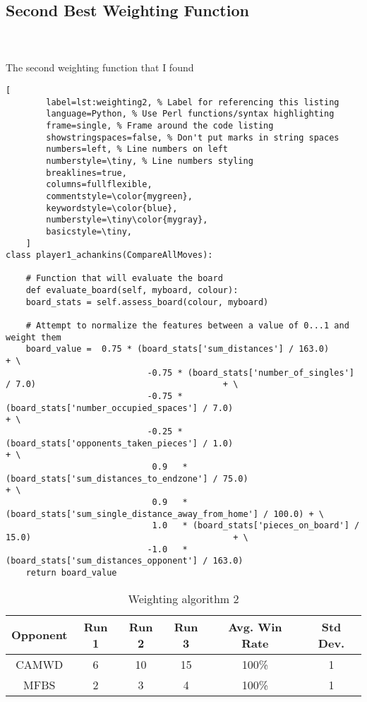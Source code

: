 \documentclass[
	12pt, %
]{fphw}
\begin{document}
\subsection{Second Best Weighting Function}

\hfill\\ \\  The second weighting function that I found

\begin{lstlisting}[
		label=lst:weighting2, % Label for referencing this listing
		language=Python, % Use Perl functions/syntax highlighting
		frame=single, % Frame around the code listing
		showstringspaces=false, % Don't put marks in string spaces
		numbers=left, % Line numbers on left
		numberstyle=\tiny, % Line numbers styling
		breaklines=true,
		columns=fullflexible,
		commentstyle=\color{mygreen},
		keywordstyle=\color{blue},
		numberstyle=\tiny\color{mygray},
		basicstyle=\tiny,
	]
class player1_achankins(CompareAllMoves):

    # Function that will evaluate the board
    def evaluate_board(self, myboard, colour):
    board_stats = self.assess_board(colour, myboard)

    # Attempt to normalize the features between a value of 0...1 and weight them
    board_value =  0.75 * (board_stats['sum_distances'] / 163.0)                                        + \
                            -0.75 * (board_stats['number_of_singles'] / 7.0)                                     + \
                            -0.75 * (board_stats['number_occupied_spaces'] / 7.0)                          + \
                            -0.25 * (board_stats['opponents_taken_pieces'] / 1.0)                            + \
                             0.9   * (board_stats['sum_distances_to_endzone'] / 75.0)                      + \
                             0.9   * (board_stats['sum_single_distance_away_from_home'] / 100.0) + \
                             1.0   * (board_stats['pieces_on_board'] / 15.0)                                        + \
                            -1.0   * (board_stats['sum_distances_opponent'] / 163.0)
    return board_value

\end{lstlisting}

\begin{table}[ht]
	\centering
	\begin{tabular}{||c | c c c c c||}
		\hline
		Opponent & Run 1&   Run 2 & Run 3 & Avg. Win Rate & Std Dev. \\ [0.5ex]
		\hline\hline
		CAMWD &  6 & 10 & 15 & 100\% & 1 \\
		\hline
		MFBS & 2 & 3 & 4 & 100\% & 1 \\ [1ex]
		\hline
	\end{tabular}
	\caption{Weighting algorithm 2}
	\label{table:2}
\end{table}
\end{document}

